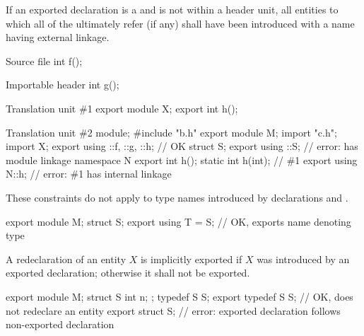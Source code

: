 \pnum
If an exported declaration is a 
and is not within a header unit,
all entities to which all of the
 ultimately refer (if any)
shall have been introduced with a name having external linkage.
\begin{example}
\begin{codeblocktu}{Source file }
int f();
\end{codeblocktu}

\begin{codeblocktu}{Importable header }
int g();
\end{codeblocktu}

\begin{codeblocktu}{Translation unit \#1}
export module X;
export int h();
\end{codeblocktu}

\begin{codeblocktu}{Translation unit \#2}
module;
#include "b.h"
export module M;
import "c.h";
import X;
export using ::f, ::g, ::h;     // OK
struct S;
export using ::S;               // error:  has module linkage
namespace N {
  export int h();
  static int h(int);            // \#1
}
export using N::h;              // error: \#1 has internal linkage
\end{codeblocktu}
\end{example}
\begin{note}
These constraints do not apply to
type names introduced by  declarations
and .
\begin{example}
\begin{codeblock}
export module M;
struct S;
export using T = S;             // OK, exports name  denoting type 
\end{codeblock}
\end{example}
\end{note}

\pnum
A redeclaration of an entity $X$
is implicitly exported
if $X$ was introduced by an exported declaration;
otherwise it shall not be exported.
\begin{example}
\begin{codeblock}
export module M;
struct S { int n; };
typedef S S;
export typedef S S;             // OK, does not redeclare an entity
export struct S;                // error: exported declaration follows non-exported declaration
\end{codeblock}
\end{example}

